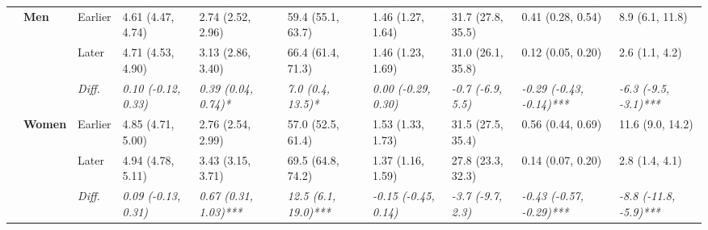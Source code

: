 \documentclass[12pt, a4paper]{article}
\begin{document}
\begin{appendices}
\begin{table}[!p]
{\begin{tabular}[t]{>{}l>{}lllllllll}
        \cmidrule{2-10}
                                              & \multirow{3}{*}{\textbf{Men}}     & Earlier                       & 4.61 (4.47, 4.74)                           & 2.74 (2.52, 2.96)                            & 59.4 (55.1, 63.7)                           & 1.46 (1.27, 1.64)                           & 31.7 (27.8, 35.5)                          & 0.41 (0.28, 0.54)                               & 8.9 (6.1, 11.8)                               \\
        \cmidrule{3-10}
                                              &                                   & Later                         & 4.71 (4.53, 4.90)                           & 3.13 (2.86, 3.40)                            & 66.4 (61.4, 71.3)                           & 1.46 (1.23, 1.69)                           & 31.0 (26.1, 35.8)                          & 0.12 (0.05, 0.20)                               & 2.6 (1.1, 4.2)                                \\
        \cmidrule{3-10}
                                              &                                   & \cellcolor{gray!10}\em{Diff.} & \cellcolor{gray!10}\em{0.10 (-0.12, 0.33)}  & \cellcolor{gray!10}\em{0.39 (0.04, 0.74)*}   & \cellcolor{gray!10}\em{7.0 (0.4, 13.5)*}    & \cellcolor{gray!10}\em{0.00 (-0.29, 0.30)}  & \cellcolor{gray!10}\em{-0.7 (-6.9, 5.5)}   & \cellcolor{gray!10}\em{-0.29 (-0.43, -0.14)***} & \cellcolor{gray!10}\em{-6.3 (-9.5, -3.1)***}  \\
        \cmidrule{2-10}
                                              & \multirow{3}{*}{\textbf{Women}}   & Earlier                       & 4.85 (4.71, 5.00)                           & 2.76 (2.54, 2.99)                            & 57.0 (52.5, 61.4)                           & 1.53 (1.33, 1.73)                           & 31.5 (27.5, 35.4)                          & 0.56 (0.44, 0.69)                               & 11.6 (9.0, 14.2)                              \\
        \cmidrule{3-10}
                                              &                                   & Later                         & 4.94 (4.78, 5.11)                           & 3.43 (3.15, 3.71)                            & 69.5 (64.8, 74.2)                           & 1.37 (1.16, 1.59)                           & 27.8 (23.3, 32.3)                          & 0.14 (0.07, 0.20)                               & 2.8 (1.4, 4.1)                                \\
        \cmidrule{3-10}
                                              &                                   & \cellcolor{gray!10}\em{Diff.} & \cellcolor{gray!10}\em{0.09 (-0.13, 0.31)}  & \cellcolor{gray!10}\em{0.67 (0.31, 1.03)***} & \cellcolor{gray!10}\em{12.5 (6.1, 19.0)***} & \cellcolor{gray!10}\em{-0.15 (-0.45, 0.14)} & \cellcolor{gray!10}\em{-3.7 (-9.7, 2.3)}   & \cellcolor{gray!10}\em{-0.43 (-0.57, -0.29)***} & \cellcolor{gray!10}\em{-8.8 (-11.8, -5.9)***} \\

\end{tabular}}
\end{table}
\end{appendices}
\end{document}
